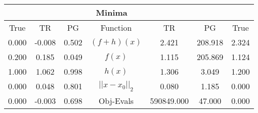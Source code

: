 \begin{tabular}{| c |c |c || c |c |c |c |}
    \hline
    \rowcolor[gray]{0.9}
\multicolumn{3}{|c|}{Parameters} & \multicolumn{4}{|c|}{Minima}\\ \hline True & TR & PG  & Function & TR & PG & True \\
    \hline
  \rowcolor[gray]{0.7}
  0.000 & -0.008 & 0.502   & $ (f + h)(x) $ & 2.421 & 208.918 & 2.324 \\
  \rowcolor[gray]{0.8}
  0.200 & 0.185 & 0.049   & $ f(x) $ & 1.115 & 205.869 & 1.124 \\
  \rowcolor[gray]{0.7}
  1.000 & 1.062 & 0.998   & $ h(x) $ & 1.306 & 3.049 & 1.200 \\
  \rowcolor[gray]{0.8}
  0.000 & 0.048 & 0.801   & $ ||x - x_0||_2 $ & 0.080 & 1.185 & 0.000 \\
  \rowcolor[gray]{0.7}
  0.000 & -0.003 & 0.698   & Obj-Evals & 590849.000 & 47.000 & 0.000 \\
\end{tabular}
